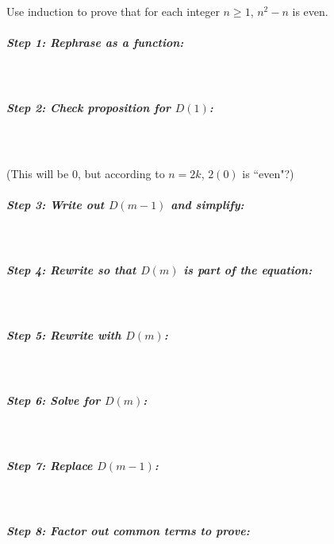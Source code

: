 \documentclass[a4paper,12pt]{book}
\newcounter{question}
\begin{document}
        \newpage
        
        \begin{questionNOGRADE}{\thequestion}
            Use induction to prove that for each integer $n \geq 1$, $n^{2} - n$ is even.

            \subparagraph{Step 1: Rephrase as a function:} ~\\
            
            \subparagraph{Step 2: Check proposition for $D(1)$:} ~\\
            ~\\ (This will be 0, but according to $n = 2k$, $2(0)$ is ``even"?)

            \subparagraph{Step 3: Write out $D(m-1)$ and simplify:} ~\\

            \subparagraph{Step 4: Rewrite so that $D(m)$ is part of the equation:} ~\\

            \subparagraph{Step 5: Rewrite with $D(m)$:}~\\

            \subparagraph{Step 6: Solve for $D(m)$:}~\\

            \subparagraph{Step 7: Replace $D(m-1)$:}~\\

            \subparagraph{Step 8: Factor out common terms to prove:}~\\
        \end{questionNOGRADE}
        
\end{document}
